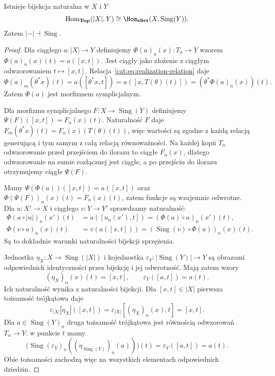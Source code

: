 \begin{twierdzenie}\label{cat:thm:realization-sing-adjunction}
Istnieje bijekcja naturalna w $X$ i $Y$
\[
 \operatorname{Hom}_{\mathbf{Top}}(|X|,Y)
 \cong
 \Hom_{\mathbf{sSet}}(X,\operatorname{Sing}(Y)).
\]
Zatem $|-|\dashv\operatorname{Sing}$.
\end{twierdzenie}
\begin{proof}
Dla ciągłego $a:|X|\to Y$ definiujemy $\Phi(a)_n(x):T_n\to Y$ wzorem $\Phi(a)_n(x)(t)=a([x,t])$. Jest ciągły jako złożenie z ciągłym odwzorowaniem $t\mapsto[x,t]$. Relacja~\eqref{cat:eq:realization-relation} daje
\[
 \Phi(a)_m(\theta^*x)(t)
 =a([\theta^*x,t])
 =a([x,T(\theta)(t)])
 =(\theta^*\Phi(a)_n(x))(t).
\]
Zatem $\Phi(a)$ jest morfizmem symplicjalnym.

Dla morfizmu symplicjalnego $F:X\to\operatorname{Sing}(Y)$ definiujemy $\Psi(F)([x,t])=F_n(x)(t)$. Naturalność $F$ daje $F_m(\theta^*x)(t)=F_n(x)(T(\theta)(t))$, więc wartości są zgodne z każdą relacją generującą i tym samym z całą relacją równoważności. Na każdej kopii $T_n$ odwzorowanie przed przejściem do ilorazu to ciągłe $F_n(x)$, dlatego odwzorowanie na sumie rozłącznej jest ciągłe, a po przejściu do ilorazu otrzymujemy ciągłe $\Psi(F)$.

Mamy $\Psi(\Phi(a))([x,t])=a([x,t])$ oraz $\Phi(\Psi(F))_n(x)(t)=F_n(x)(t)$, zatem funkcje są wzajemnie odwrotne. Dla $u:X'\to X$ i ciągłego $v:Y\to Y'$ sprawdzamy naturalność:
\[
\begin{aligned}
 \Phi(a\circ |u|)_n(x')(t)&=a([u_n(x'),t])
    =(\Phi(a)\circ u)_n(x')(t),\\
 \Phi(v\circ a)_n(x)(t)&=v(a([x,t]))
    =(\operatorname{Sing}(v)\circ\Phi(a))_n(x)(t).
\end{aligned}
\]
Są to dokładnie warunki naturalności bijekcji sprzężenia.

Jednostka $\eta_X:X\to\operatorname{Sing}(|X|)$ i kojednostka $\varepsilon_Y:|\operatorname{Sing}(Y)|\to Y$ są obrazami odpowiednich identyczności przez bijekcję i jej odwrotność. Mają zatem wzory
\[
 (\eta_X)_n(x)(t)=[x,t],\qquad \varepsilon_Y([a,t])=a(t).
\]
Ich naturalność wynika z naturalności bijekcji. Dla $[x,t]\in|X|$ pierwsza tożsamość trójkątowa daje
\[
 \varepsilon_{|X|}|\eta_X|([x,t])
 =\varepsilon_{|X|}[(\eta_X)_n(x),t]=[x,t].
\]
Dla $a\in\operatorname{Sing}(Y)_n$ druga tożsamość trójkątowa jest równością odwzorowań $T_n\to Y$: w punkcie $t$ mamy
\[
 \bigl(\operatorname{Sing}(\varepsilon_Y)_n
        ((\eta_{\operatorname{Sing}(Y)})_n(a))\bigr)(t)
 =\varepsilon_Y([a,t])=a(t).
\]
Obie tożsamości zachodzą więc na wszystkich elementach odpowiednich dziedzin.
\end{proof}

